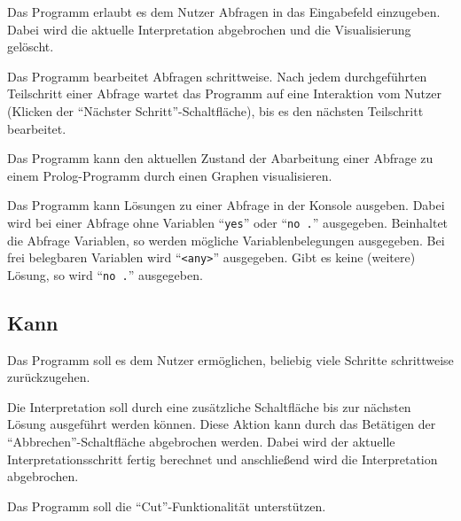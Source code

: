 \documentclass[parskip=full,11pt,twoside]{scrartcl}
\begin{document}

Das Programm erlaubt es dem Nutzer Abfragen in das Eingabefeld einzugeben. Dabei wird die aktuelle Interpretation abgebrochen und die Visualisierung gelöscht.


Das Programm bearbeitet Abfragen schrittweise. Nach jedem durchgeführten Teilschritt einer Abfrage wartet das Programm auf eine Interaktion vom Nutzer (Klicken der \enquote{Nächster Schritt}-Schaltfläche), bis es den nächsten Teilschritt bearbeitet.


Das Programm kann den aktuellen Zustand der Abarbeitung einer Abfrage zu einem Prolog-Programm durch einen Graphen visualisieren.


Das Programm kann Lösungen zu einer Abfrage in der Konsole ausgeben. Dabei wird bei einer Abfrage ohne Variablen \enquote{\texttt{yes}} oder \enquote{\texttt{no .}} ausgegeben. Beinhaltet die Abfrage Variablen, so werden mögliche Variablenbelegungen ausgegeben. Bei frei belegbaren Variablen wird \enquote{\texttt{<any>}} ausgegeben. Gibt es keine (weitere) Lösung, so wird \enquote{\texttt{no .}} ausgegeben.

\subsection{Kann}


Das Programm soll es dem Nutzer ermöglichen, beliebig viele Schritte schrittweise zurückzugehen.


Die Interpretation soll durch eine zusätzliche Schaltfläche bis zur nächsten Lösung ausgeführt werden können. Diese Aktion kann durch das Betätigen der \enquote{Abbrechen}-Schaltfläche abgebrochen werden. Dabei wird der aktuelle Interpretationsschritt fertig berechnet und anschließend wird die Interpretation abgebrochen.


Das Programm soll die \enquote{Cut}-Funktionalität unterstützen.
\end{document}
